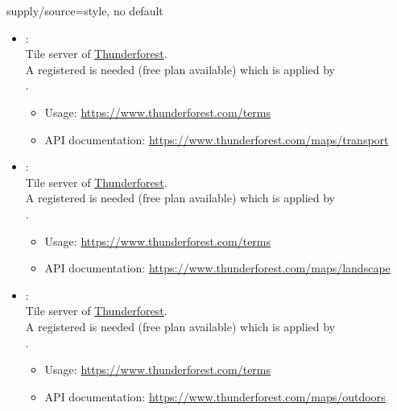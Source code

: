 \begin{docMrcKey}{supply/source}{=}{style, no default}
\begin{itemize}
  \item{}:\\
    Tile server of \href{https://www.thunderforest.com}{Thunderforest}.\\
    A registered  is needed (free plan available)
    which is applied by\\
    .
    \begin{itemize}
    \item Usage: \url{https://www.thunderforest.com/terms}
    \item API documentation: \url{https://www.thunderforest.com/maps/transport}
    \end{itemize}

  \item{}:\\
    Tile server of \href{https://www.thunderforest.com}{Thunderforest}.\\
    A registered  is needed (free plan available)
    which is applied by\\
    .
    \begin{itemize}
    \item Usage: \url{https://www.thunderforest.com/terms}
    \item API documentation: \url{https://www.thunderforest.com/maps/landscape}
    \end{itemize}

\clearpage
  \item{}:\\
    Tile server of \href{https://www.thunderforest.com}{Thunderforest}.\\
    A registered  is needed (free plan available)
    which is applied by\\
    .
    \begin{itemize}
    \item Usage: \url{https://www.thunderforest.com/terms}
    \item API documentation: \url{https://www.thunderforest.com/maps/outdoors}
    \end{itemize}


\end{itemize}
\end{docMrcKey}
